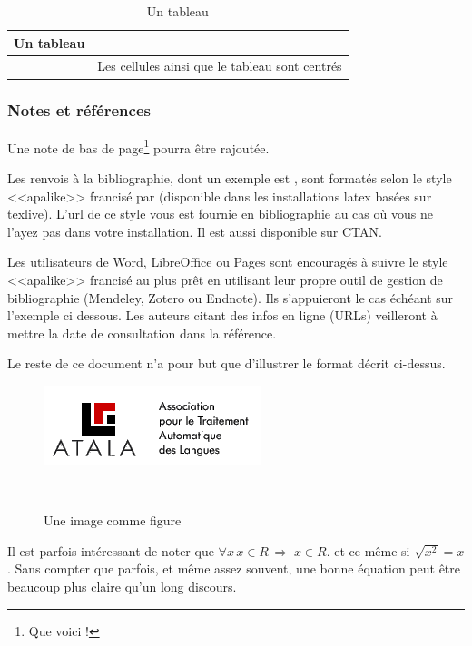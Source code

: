 \documentclass[10pt,a4paper,twoside]{article}
\begin{document}
\begin{table}[!h]
\centering
	\begin{tabular}{|c|p{4cm}|}
	\hline
	Un tableau&\\
	\hline
	&Les cellules ainsi que le tableau sont centrés\\
	\hline
	\end{tabular}
\caption{Un tableau}\label{table}
\end{table}

\subsubsection{Notes et références}

Une note de bas de page\footnote{Que voici !} pourra être rajoutée.

Les renvois à la bibliographie, dont un exemple est \cite{Bernhard07}, sont formatés selon le style <<apalike>> francisé par \cite{apalikefr} (disponible dans les installations latex basées sur texlive). L'url de ce style vous est fournie en bibliographie au cas où vous ne l'ayez pas dans votre installation. Il est aussi disponible sur CTAN.

Les utilisateurs de Word, LibreOffice ou Pages sont encouragés à suivre le style <<apalike>> francisé au plus prêt en utilisant leur propre outil de gestion de bibliographie (Mendeley, Zotero ou Endnote). Ils s'appuieront le cas échéant sur l'exemple ci dessous. Les auteurs citant des infos en ligne (URLs) veilleront à mettre la date de consultation dans la référence.

Le reste de ce document n'a pour but que d'illustrer le format décrit ci-dessus.

\begin{figure}[htbp] 
\begin{center} 
\includegraphics{images/atala.png}
\end{center} 
\caption{Une image comme figure} \label{image} \
\end{figure}

\lipsum[4]


Il est parfois intéressant de noter que $\forall x \, x \in R \,\Rightarrow\; x \in R$. et ce même si $\sqrt{x^2} = x$. Sans compter que parfois, et même assez souvent, une bonne équation peut être beaucoup plus claire qu'un long discours.
\end{document}
